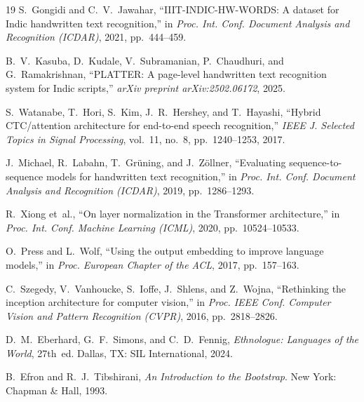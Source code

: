 \documentclass[conference]{IEEEtran}
\begin{document}
\begin{thebibliography}{19}
S.~Gongidi and C.~V.~Jawahar, ``IIIT-INDIC-HW-WORDS: A dataset for Indic handwritten text recognition,'' in \textit{Proc. Int. Conf. Document Analysis and Recognition (ICDAR)}, 2021, pp.~444--459.

B.~V.~Kasuba, D.~Kudale, V.~Subramanian, P.~Chaudhuri, and G.~Ramakrishnan, ``PLATTER: A page-level handwritten text recognition system for Indic scripts,'' \textit{arXiv preprint arXiv:2502.06172}, 2025.

S.~Watanabe, T.~Hori, S.~Kim, J.~R.~Hershey, and T.~Hayashi, ``Hybrid CTC/attention architecture for end-to-end speech recognition,'' \textit{IEEE J. Selected Topics in Signal Processing}, vol.~11, no.~8, pp.~1240--1253, 2017.

J.~Michael, R.~Labahn, T.~Gr{\"u}ning, and J.~Z{\"o}llner, ``Evaluating sequence-to-sequence models for handwritten text recognition,'' in \textit{Proc. Int. Conf. Document Analysis and Recognition (ICDAR)}, 2019, pp.~1286--1293.

R.~Xiong et~al., ``On layer normalization in the Transformer architecture,'' in \textit{Proc. Int. Conf. Machine Learning (ICML)}, 2020, pp.~10524--10533.

O.~Press and L.~Wolf, ``Using the output embedding to improve language models,'' in \textit{Proc. European Chapter of the ACL}, 2017, pp.~157--163.

C.~Szegedy, V.~Vanhoucke, S.~Ioffe, J.~Shlens, and Z.~Wojna, ``Rethinking the inception architecture for computer vision,'' in \textit{Proc. IEEE Conf. Computer Vision and Pattern Recognition (CVPR)}, 2016, pp.~2818--2826.

D.~M.~Eberhard, G.~F.~Simons, and C.~D.~Fennig, \textit{Ethnologue: Languages of the World}, 27th~ed. Dallas, TX: SIL International, 2024.

B.~Efron and R.~J.~Tibshirani, \textit{An Introduction to the Bootstrap}. New York: Chapman \& Hall, 1993.

\end{thebibliography}
\end{document}
